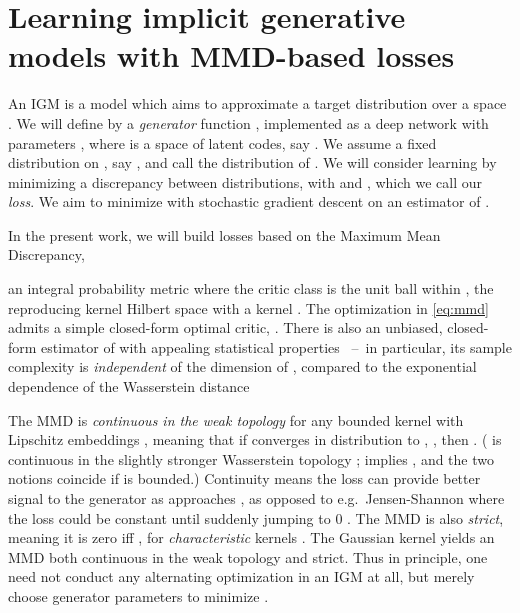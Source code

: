 \documentclass{article}
\let\citep\parencite
\begin{document}
\section{Learning implicit generative models with MMD-based losses} \label{sec:igm-losses}
An IGM is a model  which aims to approximate a target distribution 
over a space .
We will define  by a \emph{generator} function ,
implemented as a deep network with parameters ,
where  is a space of latent codes, say .
We assume a fixed distribution on ,
say ,
and call  the distribution of .
We will consider learning
by minimizing a
discrepancy  between distributions,
with  and ,
which we call our {\em loss}.
We aim to minimize  with
stochastic gradient descent on an estimator of .























In the present work,
we will build losses 
based on the Maximum Mean Discrepancy,

an integral probability metric where the critic class is the unit ball within ,
the reproducing kernel Hilbert space with a kernel .
The optimization in \eqref{eq:mmd} admits a simple closed-form optimal critic,
.
There is also an unbiased, closed-form estimator of 
with appealing statistical properties \parencite{mmd-jmlr}~--~in particular, its sample complexity is \emph{independent} of the dimension of ,
compared to the exponential dependence \parencite{weed:wasserstein-rates} of the Wasserstein distance


The MMD is \emph{continuous in the weak topology}
for any bounded kernel with Lipschitz embeddings \parencite[Theorem 3.2(b)]{opt-est-probabilities},
meaning that if  converges in distribution to , , then .
( is continuous in the slightly stronger Wasserstein topology \citep[Definition 6.9]{Villani:2009};
 implies ,
and the two notions coincide if  is bounded.)
Continuity means the loss can provide better signal to the generator as  approaches ,
as opposed to e.g.\ Jensen-Shannon where the loss could be constant until suddenly jumping to 0 \parencite[e.g.][Example 1]{wgan}.
The MMD is also {\em strict}, meaning it is zero iff , for \emph{characteristic} kernels \parencite{SriFukLan11}.
The Gaussian kernel yields an MMD both continuous in the weak topology and strict.
Thus in principle, one need not conduct any alternating optimization in an IGM at all,
but merely choose generator parameters  to minimize .
\end{document}
